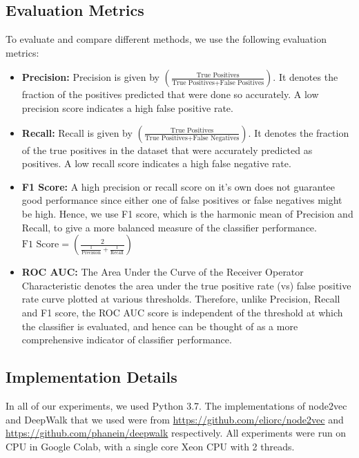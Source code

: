 \documentclass[sigconf]{acmart}
\begin{document}
\subsection{Evaluation Metrics}
To evaluate and compare different methods, we use the following evaluation metrics:
\begin{itemize}
    \item \textbf{Precision:} Precision is given by $\left( \frac{\text{True Positives}}{\text{True Positives} + \text{False Positives}}\right)$. It denotes the fraction of the positives predicted that were done so accurately. A low precision score indicates a high false positive rate.
    \item \textbf{Recall:} Recall is given by $\left( \frac{\text{True Positives}}{\text{True Positives} + \text{False Negatives}}\right)$. It denotes the fraction of the true positives in the dataset that were accurately predicted as positives. A low recall score indicates a high false negative rate.
    
    \item \textbf{F1 Score:} A high precision or recall score on it's own does not guarantee good performance since either one of false positives or false negatives might be high. Hence, we use F1 score, which is the harmonic mean of Precision and Recall, to give a more balanced measure of the classifier performance. $\text{F1 Score} = \left( \frac{2}{\frac{1}{\text{Precision}} + \frac{1}{\text{Recall}}}\right)$
    
    \item \textbf{ROC AUC:} The Area Under the Curve of the Receiver Operator Characteristic denotes the area under the true positive rate (vs) false positive rate curve plotted at various thresholds. Therefore, unlike Precision, Recall and F1 score, the ROC AUC score is independent of the threshold at which the classifier is evaluated, and hence can be thought of as a more comprehensive indicator of classifier performance.
\end{itemize}

\subsection{Implementation Details}
In all of our experiments, we used Python 3.7. The implementations of node2vec and DeepWalk that we used were from \url{https://github.com/eliorc/node2vec} and \url{https://github.com/phanein/deepwalk} respectively. All experiments were run on CPU in Google Colab, with a single core Xeon CPU with 2 threads.
\end{document}
